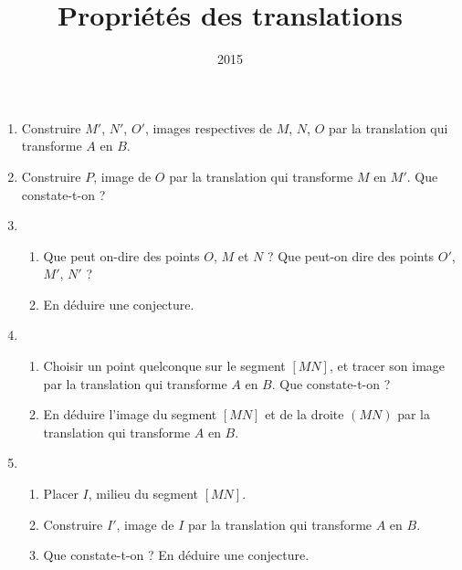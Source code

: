 \documentclass[14pt]{beamer}
\institute{Lycée Marie Curie}
\date{2015}
\title{Propriétés des translations}
\begin{document}
\begin{frame}
  \begin{enumerate}
    \item Construire $M'$, $N'$, $O'$, images respectives de $M$, $N$, $O$ par la translation qui transforme $A$ en $B$.
    \item Construire $P$, image de $O$ par la translation qui transforme $M$ en $M'$. Que constate-t-on ?
    \item 
      \begin{enumerate}
        \item Que peut on-dire des points $O$, $M$ et $N$ ? Que peut-on dire des points $O'$, $M'$, $N'$ ?
        \item En déduire une conjecture.
      \end{enumerate}
    \item 
      \begin{enumerate}
        \item Choisir un point quelconque sur le segment $[MN]$, et tracer son image par la translation qui transforme $A$ en $B$. Que constate-t-on ?
        \item En déduire l'image du segment $[MN]$ et de la droite $(MN)$ par la translation qui transforme $A$ en $B$.
      \end{enumerate}
    \item 
      \begin{enumerate}
        \item Placer $I$, milieu du segment $[MN]$.
        \item Construire $I'$, image de $I$ par la translation qui transforme $A$ en $B$.
        \item Que constate-t-on ? En déduire une conjecture.
      \end{enumerate}
  \end{enumerate}
\end{frame}
\end{document}
